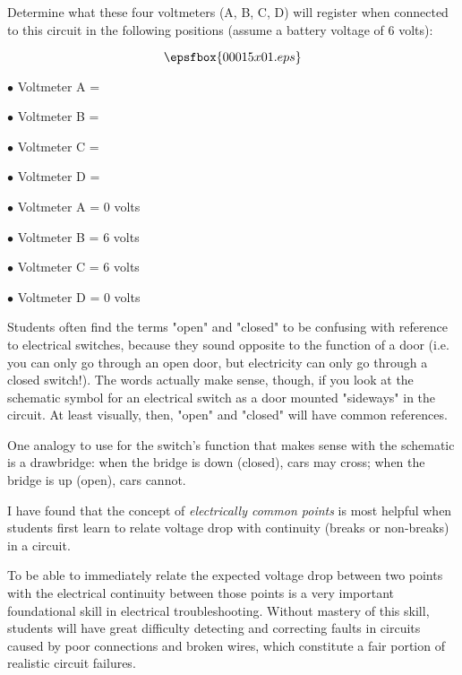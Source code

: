 

Determine what these four voltmeters (A, B, C, D) will register when connected to this circuit in the following positions (assume a battery voltage of 6 volts):

$$\epsfbox {00015x01.eps}$$

\medskip
\item{$\bullet$} Voltmeter A = 
\item{$\bullet$} Voltmeter B = 
\item{$\bullet$} Voltmeter C = 
\item{$\bullet$} Voltmeter D = 
\medskip







\medskip
\item{$\bullet$} Voltmeter A = 0 volts
\item{$\bullet$} Voltmeter B = 6 volts
\item{$\bullet$} Voltmeter C = 6 volts
\item{$\bullet$} Voltmeter D = 0 volts
\medskip







Students often find the terms "open" and "closed" to be confusing with reference to electrical switches, because they sound opposite to the function of a door (i.e. you can only go through an open door, but electricity can only go through a closed switch!).  The words actually make sense, though, if you look at the schematic symbol for an electrical switch as a door mounted "sideways" in the circuit.  At least visually, then, "open" and "closed" will have common references.

One analogy to use for the switch's function that makes sense with the schematic is a drawbridge: when the bridge is down (closed), cars may cross; when the bridge is up (open), cars cannot.

I have found that the concept of {\it electrically common points} is most helpful when students first learn to relate voltage drop with continuity (breaks or non-breaks) in a circuit.

To be able to immediately relate the expected voltage drop between two points with the electrical continuity between those points is a very important foundational skill in electrical troubleshooting.  Without mastery of this skill, students will have great difficulty detecting and correcting faults in circuits caused by poor connections and broken wires, which constitute a fair portion of realistic circuit failures.




